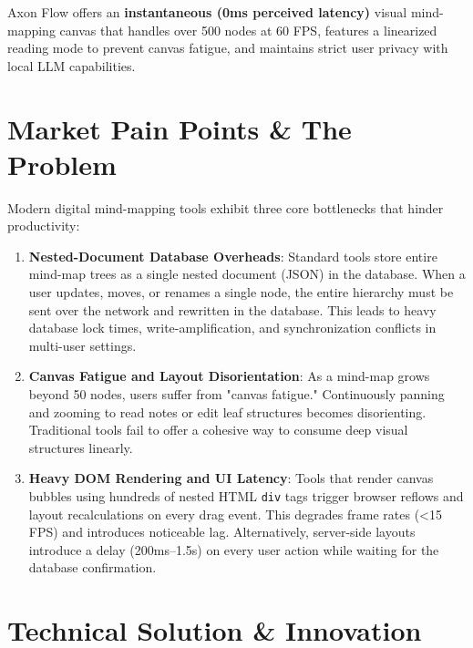 \documentclass[12pt, a4paper]{article}
\begin{document}
\begin{callout}[title=\textbf{Value Proposition}]
  Axon Flow offers an \textbf{instantaneous (0ms perceived latency)} visual mind-mapping canvas that handles over 500 nodes at 60 FPS, features a linearized reading mode to prevent canvas fatigue, and maintains strict user privacy with local LLM capabilities.
\end{callout}

\section{Market Pain Points \& The Problem}

Modern digital mind-mapping tools exhibit three core bottlenecks that hinder productivity:

\begin{enumerate}[leftmargin=*, label=\textbf{\arabic*.}]
  \item \textbf{Nested-Document Database Overheads}: Standard tools store entire mind-map trees as a single nested document (JSON) in the database. When a user updates, moves, or renames a single node, the entire hierarchy must be sent over the network and rewritten in the database. This leads to heavy database lock times, write-amplification, and synchronization conflicts in multi-user settings.
  
  \item \textbf{Canvas Fatigue and Layout Disorientation}: As a mind-map grows beyond 50 nodes, users suffer from "canvas fatigue." Continuously panning and zooming to read notes or edit leaf structures becomes disorienting. Traditional tools fail to offer a cohesive way to consume deep visual structures linearly.
  
  \item \textbf{Heavy DOM Rendering and UI Latency}: Tools that render canvas bubbles using hundreds of nested HTML \texttt{div} tags trigger browser reflows and layout recalculations on every drag event. This degrades frame rates (<15 FPS) and introduces noticeable lag. Alternatively, server-side layouts introduce a delay (200ms–1.5s) on every user action while waiting for the database confirmation.
\end{enumerate}

\newpage

\section{Technical Solution \& Innovation}
\end{document}

